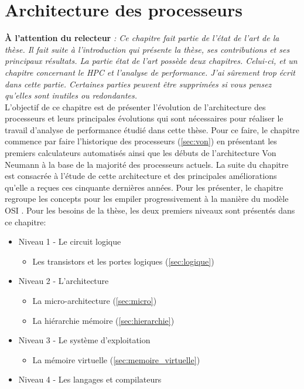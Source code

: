 \chapter{Architecture des processeurs}
\label{chap:sota:materiel}
\minitoc


\textbf{À l'attention du relecteur} \textit{: Ce chapitre fait partie de l'état de l'art de la thèse. Il fait suite à l'introduction qui présente la thèse, ses contributions et ses principaux résultats. La partie état de l'art possède deux chapitres. Celui-ci, et un chapitre concernant le HPC et l'analyse de performance. J'ai sûrement trop écrit dans cette partie. Certaines parties peuvent être supprimées si vous pensez qu'elles sont inutiles ou redondantes.}\\


L'objectif de ce chapitre est de présenter l'évolution de l'architecture des processeurs et leurs principales évolutions qui sont nécessaires pour réaliser le travail d'analyse de performance étudié dans cette thèse. 
Pour ce faire, le chapitre commence par faire l'historique des processeurs (\autoref{sec:von}) en présentant les premiers calculateurs automatisés ainsi que les débuts de l'architecture Von Neumann à la base de la majorité des processeurs actuels. 
La suite du chapitre est consacrée à l'étude de cette architecture et des principales améliorations qu'elle a reçues ces cinquante dernières années. Pour les présenter, le chapitre regroupe les concepts pour les empiler progressivement à la manière du modèle OSI   \cite{day1983osi}. Pour les besoins de la thèse, les deux premiers niveaux sont présentés dans ce chapitre:
\begin{itemize}
    \item Niveau 1 - Le circuit logique 
        \begin{itemize}
        \item Les transistors et les portes logiques (\autoref{sec:logique})
        \end{itemize}
    \item Niveau 2 - L'architecture 
    \begin{itemize}
        \item La micro-architecture (\autoref{sec:micro})
        \item La hiérarchie mémoire (\autoref{sec:hierarchie})
    \end{itemize}
    \item Niveau 3 - Le système d'exploitation
        \begin{itemize}
            \item La mémoire virtuelle  (\autoref{sec:memoire_virtuelle})
        \end{itemize}
    \item Niveau 4 - Les langages et compilateurs
\end{itemize}

